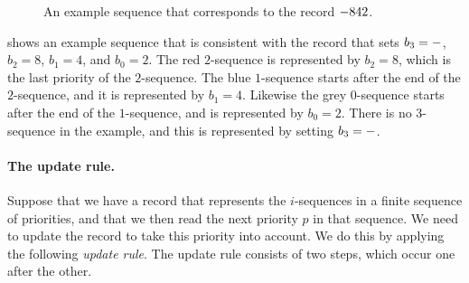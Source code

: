 \begin{figure}[!ht]
    \begin{center}
    \end{center}
\caption{An example sequence that corresponds to the record $\mathtt{-} 8 4 2$.}
\label{3-fig:ds}
\end{figure}

 shows an example sequence that is consistent with the
record that sets $b_3 = \mathtt{-}$, $b_2 = 8$, $b_1 = 4$, and $b_0 = 2$.
The red $2$-sequence is represented by $b_2 = 8$, which is the last priority of
the $2$-sequence. The blue $1$-sequence starts after the end of the
$2$-sequence, and it is represented by $b_1 = 4$. Likewise the grey
$0$-sequence starts after the end of the $1$-sequence, and is represented by
$b_0 = 2$. There is no $3$-sequence in the example, and this is represented by
setting $b_3 = \mathtt{-}$.

\paragraph{\bf The update rule.}
Suppose that we have a record that represents the $i$-sequences in a
finite sequence of priorities, and that we then read the next priority $p$ in
that sequence. We need to update the record to take this priority into
account. We do this by applying the following \emph{update rule}.
The update rule consists of two steps, which occur one after the other.

